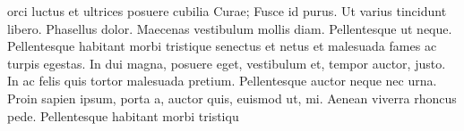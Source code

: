 orci luctus et ultrices posuere cubilia Curae; Fusce id purus. Ut varius tincidunt libero. Phasellus dolor. Maecenas vestibulum mollis diam. Pellentesque ut neque. Pellentesque habitant morbi tristique senectus et netus et malesuada fames ac turpis egestas. In dui magna, posuere eget, vestibulum et, tempor auctor, justo. In ac felis quis tortor malesuada pretium. Pellentesque auctor neque nec urna. Proin sapien ipsum, porta a, auctor quis, euismod ut, mi. Aenean viverra rhoncus pede. Pellentesque habitant morbi tristiqu